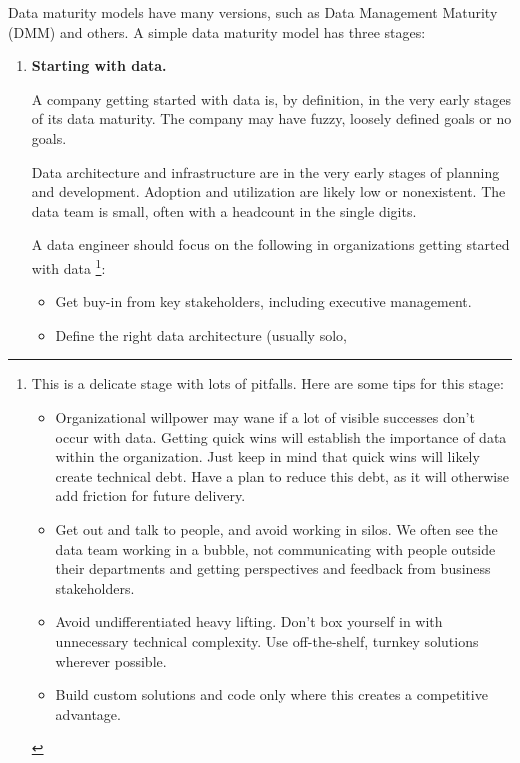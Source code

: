 Data maturity models have many versions, such as Data Management
Maturity (DMM) and others. A simple data maturity model has three
stages:
\begin{enumerate}
    \item \textbf{Starting with data.}
    
    \noindent
    A company getting started with data is, by definition, in the
    very early stages of  its data maturity. The company may have
    fuzzy, loosely defined goals or no goals.

    Data architecture and infrastructure are in the very early
    stages of planning and development. Adoption and utilization
    are likely low or nonexistent. The data team is small, often
    with a headcount in the single digits.

    A data engineer should focus on the following in organizations
    getting started with data
    \footnote{
        This is a delicate stage with lots of pitfalls.
        Here are some tips for this stage:
        \begin{itemize}
            \item Organizational willpower may wane if a lot of
            visible successes don't occur with data. Getting quick
            wins will establish the importance of data within the
            organization. Just keep in mind that quick wins will
            likely create technical debt. Have a plan to reduce
            this debt, as it will otherwise add friction for future
            delivery.
            \item Get out and talk to people, and avoid working in
            silos. We often see the data team working in a bubble,
            not communicating with people outside their departments
            and getting perspectives and feedback from business
            stakeholders.
            \item Avoid undifferentiated heavy lifting. Don't box
            yourself in with unnecessary technical complexity.
            Use off-the-shelf, turnkey solutions wherever possible.
            \item Build custom solutions and code only where this
            creates a competitive advantage.
        \end{itemize}
    }:
    \begin{itemize}
        \item Get buy-in from key stakeholders, including executive
        management.
        \item Define the right data architecture (usually solo,

\end{itemize}
\end{enumerate}
